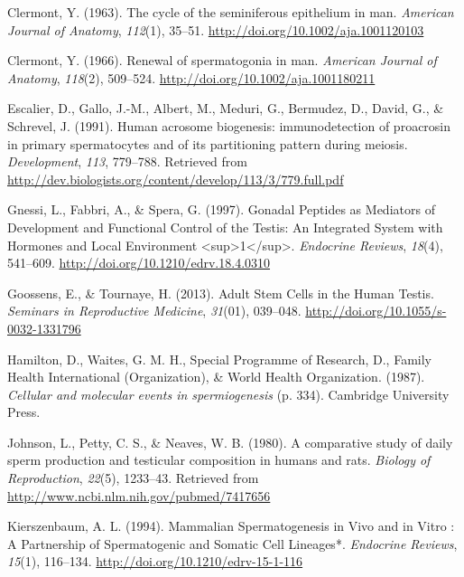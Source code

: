 \documentclass[12pt,twoside]{reedthesis}
\theoremstyle{definition}
\theoremstyle{definition}
\theoremstyle{remark}
\begin{document}
  \noindent
  
  \setlength{\parindent}{-0.20in} \setlength{\leftskip}{0.20in}
  \setlength{\parskip}{8pt}
  
  \hypertarget{refs}{}
  \hypertarget{ref-Clermont1963}{}
  Clermont, Y. (1963). The cycle of the seminiferous epithelium in man.
  \emph{American Journal of Anatomy}, \emph{112}(1), 35--51.
  \url{http://doi.org/10.1002/aja.1001120103}
  
  \hypertarget{ref-Clermont1966}{}
  Clermont, Y. (1966). Renewal of spermatogonia in man. \emph{American
  Journal of Anatomy}, \emph{118}(2), 509--524.
  \url{http://doi.org/10.1002/aja.1001180211}
  
  \hypertarget{ref-Escalier1991}{}
  Escalier, D., Gallo, J.-M., Albert, M., Meduri, G., Bermudez, D., David,
  G., \& Schrevel, J. (1991). Human acrosome biogenesis: immunodetection
  of proacrosin in primary spermatocytes and of its partitioning pattern
  during meiosis. \emph{Development}, \emph{113}, 779--788. Retrieved from
  \url{http://dev.biologists.org/content/develop/113/3/779.full.pdf}
  
  \hypertarget{ref-Gnessi1997}{}
  Gnessi, L., Fabbri, A., \& Spera, G. (1997). Gonadal Peptides as
  Mediators of Development and Functional Control of the Testis: An
  Integrated System with Hormones and Local Environment
  \textless{}sup\textgreater{}1\textless{}/sup\textgreater{}.
  \emph{Endocrine Reviews}, \emph{18}(4), 541--609.
  \url{http://doi.org/10.1210/edrv.18.4.0310}
  
  \hypertarget{ref-Goossens2013}{}
  Goossens, E., \& Tournaye, H. (2013). Adult Stem Cells in the Human
  Testis. \emph{Seminars in Reproductive Medicine}, \emph{31}(01),
  039--048. \url{http://doi.org/10.1055/s-0032-1331796}
  
  \hypertarget{ref-Hamilton1987}{}
  Hamilton, D., Waites, G. M. H., Special Programme of Research, D.,
  Family Health International (Organization), \& World Health
  Organization. (1987). \emph{Cellular and molecular events in
  spermiogenesis} (p. 334). Cambridge University Press.
  
  \hypertarget{ref-Johnson1980}{}
  Johnson, L., Petty, C. S., \& Neaves, W. B. (1980). A comparative study
  of daily sperm production and testicular composition in humans and rats.
  \emph{Biology of Reproduction}, \emph{22}(5), 1233--43. Retrieved from
  \url{http://www.ncbi.nlm.nih.gov/pubmed/7417656}
  
  \hypertarget{ref-KIERSZENBAUM1994}{}
  Kierszenbaum, A. L. (1994). Mammalian Spermatogenesis in Vivo and in
  Vitro : A Partnership of Spermatogenic and Somatic Cell Lineages*.
  \emph{Endocrine Reviews}, \emph{15}(1), 116--134.
  \url{http://doi.org/10.1210/edrv-15-1-116}


\end{document}
